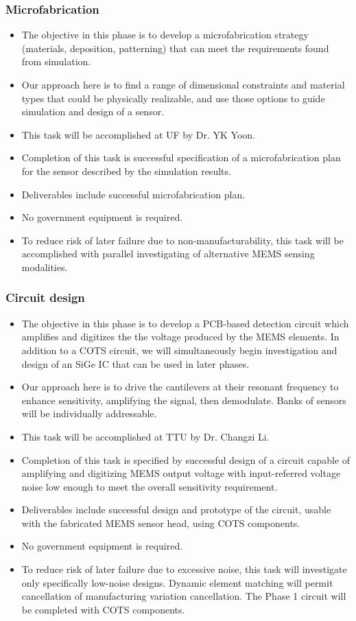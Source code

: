 \subsubsection{Microfabrication}\label{sec:p1:mf}
\begin{itemize}
\item The objective in this phase is to develop a microfabrication strategy (materials, deposition, patterning) that can meet the requirements found from simulation.
\item Our approach here is to find a range of dimensional constraints and material types that could be physically realizable, and use those options to guide simulation and design of a sensor.
\item This task will be accomplished at UF by Dr. YK Yoon.
\item Completion of this task is successful specification of a microfabrication plan for the sensor described by the simulation results.
\item Deliverables include successful microfabrication plan.
\item No government equipment is required.
\item To reduce risk of later failure due to non-manufacturability, this task will be accomplished with parallel investigating of alternative MEMS sensing modalities.
\end{itemize}
\subsubsection{Circuit design}\label{sec:p1:cir}
\begin{itemize}
\item The objective in this phase is to develop a PCB-based detection circuit which amplifies and digitizes the the voltage produced by the MEMS elements. In addition to a COTS circuit, we will simultaneously begin investigation and design of an SiGe IC that can be used in later phases.
\item Our approach here is to drive the cantilevers at their resonant frequency to enhance sensitivity, amplifying the signal, then demodulate. Banks of sensors will be individually addressable. 
\item This task will be accomplished at TTU by Dr. Changzi Li.
\item Completion of this task is specified by successful design of a circuit capable of amplifying and digitizing MEMS output voltage with input-referred voltage noise low enough to meet the overall sensitivity requirement.
\item Deliverables include successful design and prototype of the circuit, usable with the fabricated MEMS sensor head, using COTS components.
\item No government equipment is required.
\item To reduce risk of later failure due to excessive noise, this task will investigate only specifically low-noise designs. Dynamic element matching will permit cancellation of manufacturing variation cancellation. The Phase 1 circuit will be completed with COTS components.
\end{itemize}

